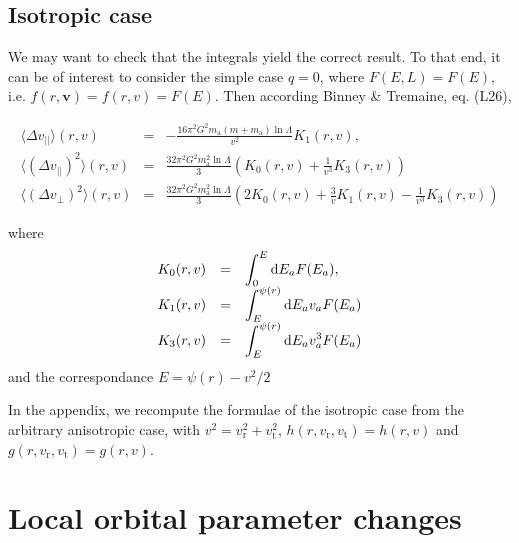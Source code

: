 \documentclass[11pt]{article}
\newcommand{\rt}{\mathrm{t}}
\newcommand{\rr}{\mathrm{r}}
\newcommand{\vr}{v_{\rr}}
\newcommand{\vt}{v_{\rt}}
\newcommand{\bv}{\boldsymbol{v}}
\newcommand{\ra}{\mathrm{a}}
\newcommand{\dvPar}{\Delta v_{||}}
\newcommand{\dvPerp}{\Delta v_{\perp}}
\newcommand{\dvParAvrLoc}{\langle \dvPar \rangle}
\newcommand{\dvParSqAvrLoc}{\langle(\dvPar)^{2}\rangle}
\newcommand{\dvPerpSqAvrLoc}{\langle(\dvPerp)^{2}\rangle}
\newcommand{\ma}{m_{\ra}}
\begin{document}
\subsection{Isotropic case}
\label{subsec:Isotropic}

We may want to check that the integrals yield the correct result.
To that end, it can be of interest to consider the simple case $q=0$,
where $F(E,L)=F(E)$, i.e. $f(r,\bv)=f(r,v)=F(E)$.
Then according Binney \& Tremaine, eq. (L26),

\begin{equation}
\begin{array}{ccl}
  \dvParAvrLoc(r,v) & =&\displaystyle{-\frac{16\pi^{2}G^{2}\ma(m+\ma)\ln\Lambda}{v^{2}}K_{1}(r,v)} ,\\
  
  \dvParSqAvrLoc(r,v) & = &\displaystyle{\frac{32\pi^{2}G^{2}\ma^{2}\ln\Lambda}{3}\left(K_{0}(r,v)+\frac{1}{v^{3}}K_{3}(r,v)\right)}\\
  
  \dvPerpSqAvrLoc(r,v) & = &\displaystyle{\frac{32\pi^{2}G^{2}\ma^{2}\ln\Lambda}{3}\left(2K_{0}(r,v)+\frac{3}{v}K_{1}(r,v)-\frac{1}{v^{3}}K_{3}(r,v)\right)}   
\end{array}
\label{eq:IsoLocDiffCoefsdRdT}
\end{equation}

where
\begin{equation}
\begin{array}{ccl}
 K_{0}(r,v) & =&\displaystyle{\int_{0}^{E}{\rm d}E_{a}F(E_{a})} ,\\
  
  K_{1}(r,v) & = &\displaystyle{\int_{E}^{\psi(r)}{\rm d}E_{a}v_{a}F(E_{a})}\\
  
  K_{3}(r,v) & = &\displaystyle{\int_{E}^{\psi(r)}{\rm d}E_{a}v_{a}^{3}F(E_{a})}   
\end{array}
\label{eq:K_Iso}
\end{equation}
and the correspondance $E = \psi(r)-v^{2}/2$

In the appendix, we recompute the formulae of the isotropic case from
the arbitrary anisotropic case, with $v^{2}=\vr^{2}+\vt^{2}$,
$h(r,\vr,\vt)=h(r,v)$ and $g(r,\vr,\vt)=g(r,v)$.

\section{Local orbital parameter changes}
\label{sec:Local_dE_dL}
\end{document}

